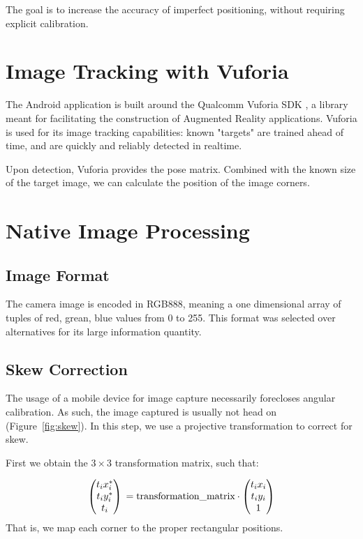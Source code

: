 \documentclass[11pt, letterpaper]{article}
\begin{document}
The goal is to increase the accuracy of imperfect positioning, without requiring explicit calibration.

\section{Image Tracking with Vuforia}
The Android application is built around the Qualcomm Vuforia SDK \cite{vuforia}, a library meant for facilitating the construction of Augmented Reality applications.
Vuforia is used for its image tracking capabilities: known "targets" are trained ahead of time, and are quickly and reliably detected in realtime.

Upon detection,	Vuforia provides the pose matrix. Combined with the known size of the target image, we can calculate the position of the image corners.

\section{Native Image Processing}
\subsection{Image Format}
The camera image is encoded in RGB888, meaning a one dimensional array of tuples of red, grean, blue values from 0 to 255.
This format was selected over alternatives for its large information quantity.

\subsection{Skew Correction}
The usage of a mobile device for image capture necessarily forecloses angular calibration.
As such, the image captured is usually not head on (Figure~\ref{fig:skew}).
In this step, we use a projective transformation to correct for skew.

First we obtain the $3 \times 3$ transformation matrix, such that:

$$
\begin{pmatrix}
t_i x_i^*\\
t_i y_i^*\\
t_i
\end{pmatrix}\\
= \text{transformation\_matrix} \cdot
\begin{pmatrix}
t_i x_i\\
t_i y_i\\
1
\end{pmatrix}
$$
That is, we map each corner to the proper rectangular positions.
\end{document}
